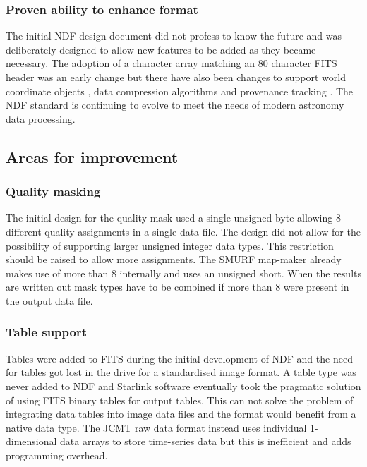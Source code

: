 \documentclass[final,authoryear,5p,times,twocolumn]{elsarticle}
\begin{document}
{\subsubsection{Proven ability to enhance format}

The initial NDF design document did not profess to know the future and
was deliberately designed to allow new features to be added as they
became necessary. The adoption of a character array matching an 80
character FITS header was an early change but there have also been
changes to support world coordinate objects
\citep{2001ASPC..238..129B}, data compression algorithms
\citep{2008ASPC..394..650C} and provenance tracking
\citep{2009ASPC..411..418J}. The NDF standard is continuing to evolve
to meet the needs of modern astronomy data processing.

\subsection{Areas for improvement}

\subsubsection{Quality masking}

The initial design for the quality mask used a single unsigned byte
allowing 8 different quality assignments in a single data file. The
design did not allow for the possibility of supporting larger unsigned
integer data types. This restriction should be raised to allow more
assignments. The SMURF map-maker
\citep[][ascl:1310.007]{2013MNRAS.430.2545C} already makes use of more
than 8 internally and uses an unsigned short. When the results are
written out mask types have to be combined if more than 8 were present
in the output data file.

\subsubsection{Table support}

Tables were added to FITS \citep{1988A&AS...73..365H} during the
initial development of NDF and the need for tables got lost in the
drive for a standardised image format. A table type was never added to
NDF and Starlink software eventually took the pragmatic solution of
using FITS binary tables \citep{1995A&AS..113..159C} for output
tables. This can not solve the problem of integrating data tables into
image data files and the format would benefit from a native data
type. The JCMT raw data format instead uses individual 1-dimensional
data arrays to store time-series data but this is inefficient and adds
programming overhead.

}
\end{document}
